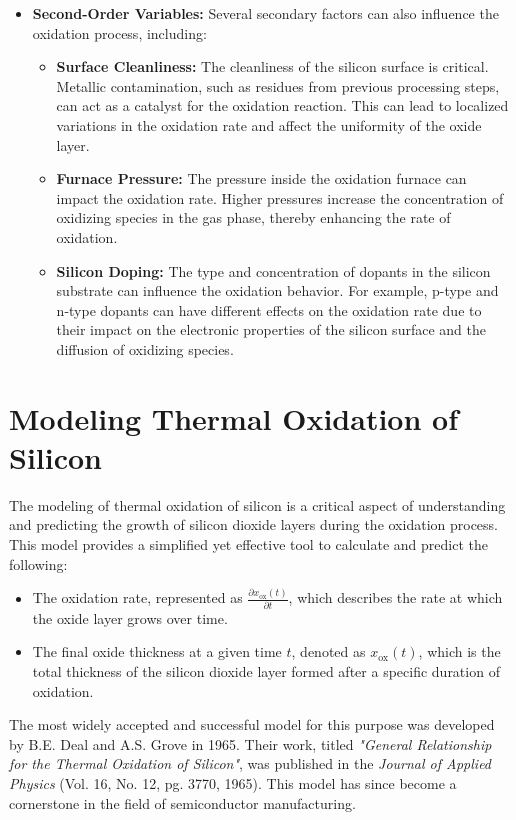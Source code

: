 \documentclass{report}
\begin{document}
\begin{itemize}
    \item \textbf{Second-Order Variables:} 
    Several secondary factors can also influence the oxidation process, including:
    \begin{itemize}
        \item \textbf{Surface Cleanliness:} 
        The cleanliness of the silicon surface is critical. Metallic contamination, such as residues from previous processing steps, can act as a catalyst for the oxidation reaction. This can lead to localized variations in the oxidation rate and affect the uniformity of the oxide layer.
        \item \textbf{Furnace Pressure:} 
        The pressure inside the oxidation furnace can impact the oxidation rate. Higher pressures increase the concentration of oxidizing species in the gas phase, thereby enhancing the rate of oxidation.
        \item \textbf{Silicon Doping:} 
        The type and concentration of dopants in the silicon substrate can influence the oxidation behavior. For example, p-type and n-type dopants can have different effects on the oxidation rate due to their impact on the electronic properties of the silicon surface and the diffusion of oxidizing species.
    \end{itemize}
\end{itemize}
\section{Modeling Thermal Oxidation of Silicon}

The modeling of thermal oxidation of silicon is a critical aspect of understanding and predicting the growth of silicon dioxide layers during the oxidation process. This model provides a simplified yet effective tool to calculate and predict the following:

\begin{itemize}
    \item The oxidation rate, represented as $\frac{\partial x_{\text{ox}}(t)}{\partial t}$, which describes the rate at which the oxide layer grows over time.
    \item The final oxide thickness at a given time $t$, denoted as $x_{\text{ox}}(t)$, which is the total thickness of the silicon dioxide layer formed after a specific duration of oxidation.
\end{itemize}

The most widely accepted and successful model for this purpose was developed by B.E. Deal and A.S. Grove in 1965. Their work, titled \textit{"General Relationship for the Thermal Oxidation of Silicon"}, was published in the \textit{Journal of Applied Physics} (Vol. 16, No. 12, pg. 3770, 1965). This model has since become a cornerstone in the field of semiconductor manufacturing.
\end{document}
